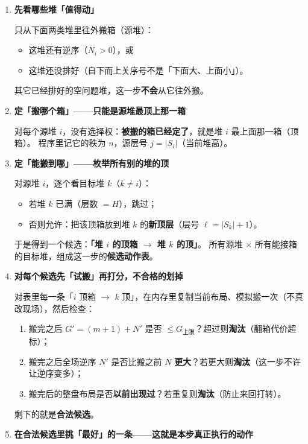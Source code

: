 \documentclass[11pt,a4paper]{ctexart}
\newcommand{\capG}{G_{\mathrm{上限}}}
\begin{document}
\begin{enumerate}[label=\textbf{第 \arabic* 步}, leftmargin=2.2em]

  \item \textbf{先看哪些堆「值得动」}

  只从下面两类堆里往外搬箱（源堆）：
  \begin{itemize}
    \item 这堆还有逆序（$N_i>0$），或
    \item 这堆还没排好（自下而上关序号不是「下面大、上面小」）。
  \end{itemize}
  其它已经排好的空问题堆，这一步\textbf{不会}从它往外搬。

  \item \textbf{定「搬哪个箱」——只能是源堆最顶上那一箱}

  对每个源堆 $i$，没有选择权：\textbf{被搬的箱已经定了}，就是堆 $i$ 最上面那一箱（顶箱）。
  程序里记它的秩为 $n$，源层号 $j=|S_i|$（当前堆高）。

  \item \textbf{定「能搬到哪」——枚举所有别的堆的顶}

  对源堆 $i$，逐个看目标堆 $k$（$k\neq i$）：
  \begin{itemize}
    \item 若堆 $k$ 已满（层数 $=H$），跳过；
    \item 否则允许：把该顶箱放到堆 $k$ 的\textbf{新顶层}（层号 $\ell=|S_k|+1$）。
  \end{itemize}
  于是得到一个候选：\textbf{「堆 $i$ 的顶箱 $\to$ 堆 $k$ 的顶」}。
  所有源堆 $\times$ 所有能接箱的目标堆，组成这一步的\textbf{候选动作表}。

  \item \textbf{对每个候选先「试搬」再打分，不合格的划掉}

  对表里每一条「$i$ 顶箱 $\to$ $k$ 顶」，在内存里复制当前布局、模拟搬一次（不真改现场），然后检查：
  \begin{enumerate}[label=(\alph*)]
    \item 搬完之后 $G' = (m+1) + N'$ 是否 $\le \capG$？超过则\textbf{淘汰}（翻箱代价超标）；
    \item 搬完之后全场逆序 $N'$ 是否比搬之前 $N$ \textbf{更大}？若更大则\textbf{淘汰}（这一步不许让逆序变多）；
    \item 搬完后的整盘布局是否\textbf{以前出现过}？若重复则\textbf{淘汰}（防止来回打转）。
  \end{enumerate}
  剩下的就是\textbf{合法候选}。

  \item \textbf{在合法候选里挑「最好」的一条——这就是本步真正执行的动作}


\end{enumerate}
\end{document}

